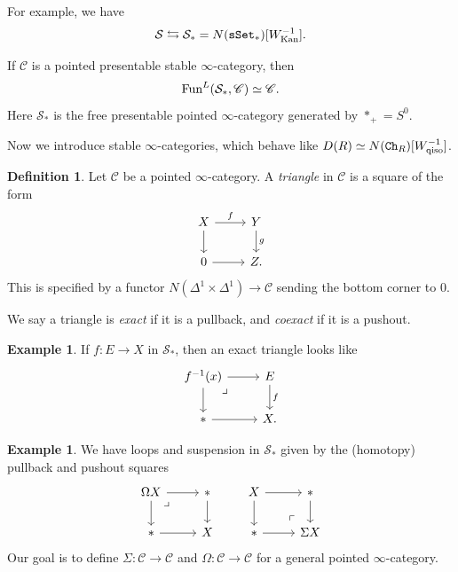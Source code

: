 \documentclass[12pt]{amsart}
\theoremstyle{definition}
\newtheorem{definition}[theorem]{Definition}
\newtheorem{example}[theorem]{Example}
\begin{document}
For example, we have
\begin{align*}
    \mathcal{S} \leftrightarrows \mathcal{S}_\ast = N(\texttt{sSet}_\ast)[W_\text{Kan}^{-1}].
\end{align*}

If $\mathscr{C}$ is a pointed presentable stable $\infty$-category, then
\begin{align*}
    \text{Fun}^L(\mathcal{S}_\ast, \mathscr{C}) \simeq \mathscr{C}.
\end{align*}
Here $\mathcal{S}_\ast$ is the free presentable pointed $\infty$-category generated by $\ast_+ = S^0$.

Now we introduce stable $\infty$-categories, which behave like $D(R) \simeq N(\texttt{Ch}_R)[W_\text{qiso}^{-1}]$.

\begin{definition} Let $\mathscr{C}$ be a pointed $\infty$-category. A \textit{triangle} in $\mathscr{C}$ is a square of the form
\[ \begin{tikzcd}
    X\rar["f"]\dar & Y\dar["g" right]\\
    0\rar & Z.
\end{tikzcd} \]
This is specified by a functor $N(\Delta^1 \times \Delta^1) \to \mathscr{C}$ sending the bottom corner to 0.
\end{definition}

We say a triangle is \textit{exact} if it is a pullback, and \textit{coexact} if it is a pushout.

\begin{example} If $f: E \to X$ in $\mathcal{S}_\ast$, then an exact triangle looks like
\[ \begin{tikzcd}
    f^{-1}(x)\rar\dar\pb & E\dar["f" right]\\
    \ast\rar & X.
\end{tikzcd} \]
\end{example}

\begin{example} We have loops and suspension in $\mathcal{S}_\ast$ given by the (homotopy) pullback and pushout squares
\[ \begin{tikzcd}
    \Omega X\dar\rar\pb & \ast\dar\\
    \ast\rar & X
\end{tikzcd} \quad\quad \begin{tikzcd}
    X\rar\dar & \ast\dar\\
    \ast\rar & \Sigma X \po
\end{tikzcd} \]
Our goal is to define $\Sigma: \mathscr{C} \to \mathscr{C}$ and $\Omega: \mathscr{C} \to \mathscr{C}$ for a general pointed $\infty$-category.
\end{example}
\end{document}
